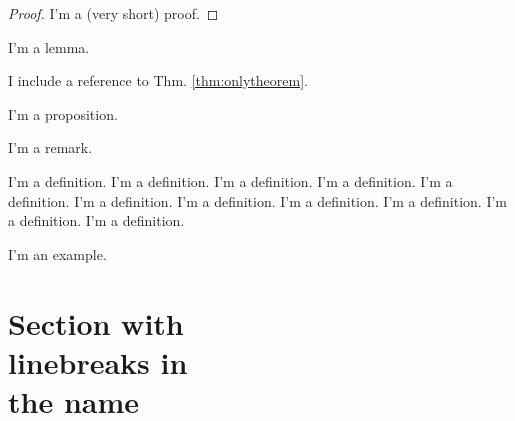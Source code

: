 \begin{theorem}
\label{thm:onlytheorem}
\blindtext
\end{theorem}

\begin{proof}
I'm a (very short) proof.
\end{proof}

\begin{lemma}
I'm a lemma.
\end{lemma}

\begin{corollary}
I include a reference to Thm. \ref{thm:onlytheorem}.
\end{corollary}

\begin{proposition}
I'm a proposition.
\end{proposition}

\begin{remark}
I'm a remark. 
\end{remark}

\begin{definition}
I'm a definition. I'm a definition. I'm a definition. I'm a definition. I'm a definition. I'm a definition. I'm a definition. I'm a definition. I'm a definition. I'm a definition. I'm a definition. 
\end{definition}

\begin{example}
I'm an example.
\end{example}


\section[Optional table of contents heading]{Section with\\ linebreaks in\\the
name}


\Blindtext[2]




